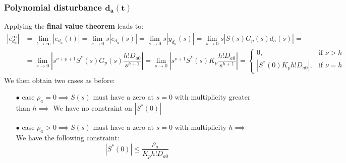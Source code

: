 \documentclass[a4paper,10pt,titlepage]{article}
\numberwithin{equation}{subsection}
\begin{document}
	\subsubsection{Polynomial disturbance $\bm{d_a(t)}$}
	Applying the \textbf{final value theorem} leads to:
	\begin{align}
		\left| e_{d_a}^\infty \right| &= \displaystyle\lim_{t\to\infty} 	\left|e_{d_a}(t)\right| = \displaystyle\lim_{s\to0}s \left|e_{d_a}(s)\right| = \displaystyle\lim_{s\to0}s \left|y_{d_a}(s)\right| = \displaystyle\lim_{s\to0}s \left| S(s)G_p(s)d_a(s) \right| = \nonumber \\
		&= \displaystyle\lim_{s\to0} 	\left|s^{\nu+p+1}S^*(s)G_p(s)\dfrac{h!D_{a0}}{s^{h+1}}\right| = \displaystyle\lim_{s\to0} \left|s^{\nu+1}S^*(s)K_p\dfrac{h!D_{a0}}{s^{h+1}}\right| =
		\begin{cases}
			0, & \text{if } \nu>h \\
			\left|S^*(0)K_ph!D_{a0}\right|, & \text{if } \nu = h
		\end{cases}
	\end{align}
	We then obtain two cases as before:
	\begin{enumerate}
		\item[$\bullet$] case $\rho_a=0 \implies S(s)$ must have a zero at $s=0$ with multiplicity greater than $h \implies$ We have no constraint on $\left|S^*(0)\right| $ 
		\item[$\bullet$] case $\rho_a>0 \implies S(s)$ must have a zero at $s=0$ with multiplicity $h \implies$ We have the following constraint:
		\begin{equation}
			\left|S^*(0)\right| \leq \dfrac{\rho_a}{K_ph!D_{a0}}	
		\end{equation}
	\end{enumerate}
	
\end{document}
